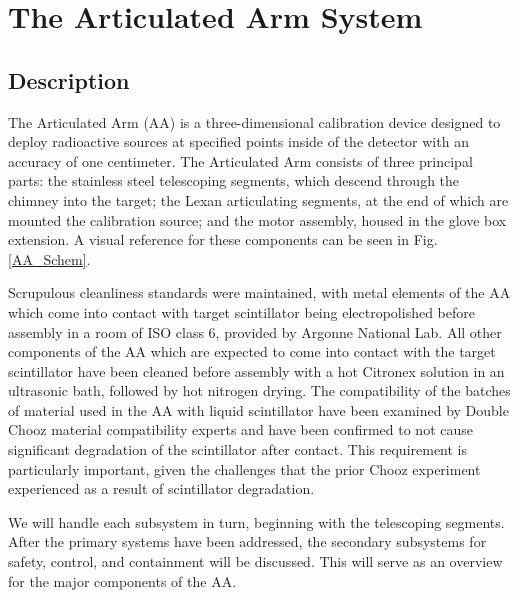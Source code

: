 \chapter{The Articulated Arm System}
\label{chap:AA}


\section{Description}

The Articulated Arm (AA) is a three-dimensional calibration device designed to deploy radioactive sources at specified points inside of the detector with an accuracy of one centimeter. The Articulated Arm consists of three principal parts: the stainless steel telescoping segments, which descend through the chimney into the target; the Lexan articulating segments, at the end of which are mounted the calibration source; and the motor assembly, housed in the glove box extension. A visual reference for these components can be seen in Fig. \ref{AA_Schem}. 

Scrupulous cleanliness standards were maintained, with metal elements of the AA which come into contact with target scintillator being electropolished before assembly in a room of ISO class 6, provided by Argonne National Lab. All other components of the AA which are expected to come into contact with the target scintillator have been cleaned before assembly with a hot Citronex solution in an ultrasonic bath, followed by hot nitrogen drying. The compatibility of the batches of material used in the AA with liquid scintillator have been examined by Double Chooz material compatibility experts and have been confirmed to not cause significant degradation of the scintillator after contact. This requirement is particularly important, given the challenges that the prior Chooz experiment experienced as a result of scintillator degradation. 

We will handle each subsystem in turn, beginning with the telescoping segments. After the primary systems have been addressed, the secondary subsystems for safety, control, and containment will be discussed. This will serve as an overview for the major components of the AA. 
 
